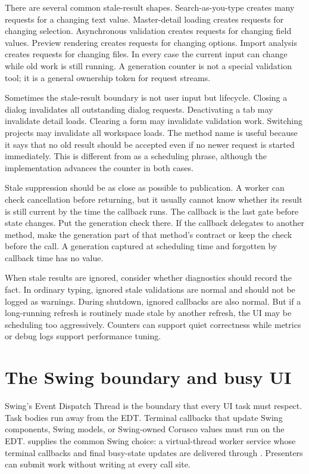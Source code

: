 There are several common stale-result shapes. Search-as-you-type creates many
requests for a changing text value. Master-detail loading creates requests for
changing selection. Asynchronous validation creates requests for changing field
values. Preview rendering creates requests for changing options. Import
analysis creates requests for changing files. In every case the current input
can change while old work is still running. A generation counter is not a
special validation tool; it is a general ownership token for request streams.

Sometimes the stale-result boundary is not user input but lifecycle. Closing a
dialog invalidates all outstanding dialog requests. Deactivating a tab may
invalidate detail loads. Clearing a form may invalidate validation work.
Switching projects may invalidate all workspace loads. The method name
 is useful because it says that no old result should be
accepted even if no newer request is started immediately. This is different
from  as a scheduling phrase, although the implementation advances
the counter in both cases.

Stale suppression should be as close as possible to publication. A worker can
check cancellation before returning, but it usually cannot know whether its
result is still current by the time the callback runs. The callback is the last
gate before state changes. Put the generation check there. If the callback
delegates to another method, make the generation part of that method's
contract or keep the check before the call. A generation captured at scheduling
time and forgotten by callback time has no value.

When stale results are ignored, consider whether diagnostics should record the
fact. In ordinary typing, ignored stale validations are normal and should not
be logged as warnings. During shutdown, ignored callbacks are also normal. But
if a long-running refresh is routinely made stale by another refresh, the UI
may be scheduling too aggressively. Counters can support quiet correctness
while metrics or debug logs support performance tuning.

\section{The Swing boundary and busy UI}

Swing's Event Dispatch Thread is the boundary that every UI task must respect.
Task bodies run away from the EDT. Terminal callbacks that update Swing
components, Swing models, or Swing-owned Corusco values must run on the EDT.
 supplies the common Swing choice: a
virtual-thread worker service whose terminal callbacks and final busy-state
updates are delivered through . Presenters can submit
work without writing  at every call site.

